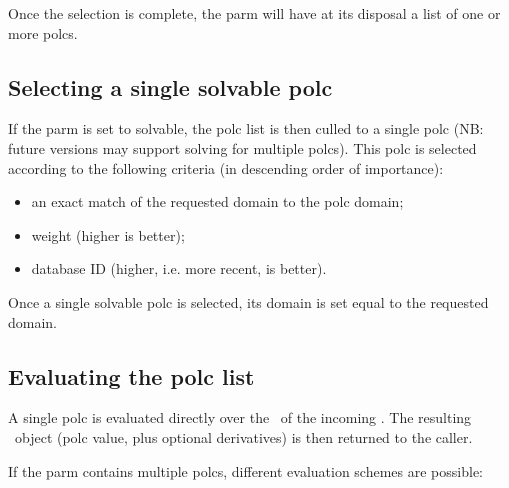 \documentclass[10pt,twoside]{book}
\begin{document}
  Once the selection is complete, the parm will have at its disposal a list of
  one or more polcs. 

\subsection{Selecting a single solvable polc}
  
  If the parm is set to solvable, the polc list is then culled to a single polc
  (NB: future versions may support solving for multiple polcs). This polc is
  selected according to the following criteria (in descending order of
  importance):

  \begin{itemize}
  
  \item an exact match of the requested domain to the polc domain;
  
  \item weight (higher is better);
  
  \item database ID (higher, i.e. more recent, is better).
  
  \end{itemize}
  
  Once a single solvable polc is selected, its domain is set equal to the
  requested domain.
  
\subsection{Evaluating the polc list}

  A single polc is evaluated directly over the \Cells\ of the incoming
  \Request. The resulting \VellSet\ object (polc value, plus optional
  derivatives) is then returned to the caller. 
  
  If the parm contains multiple polcs, different evaluation schemes are
  possible:
\end{document}
